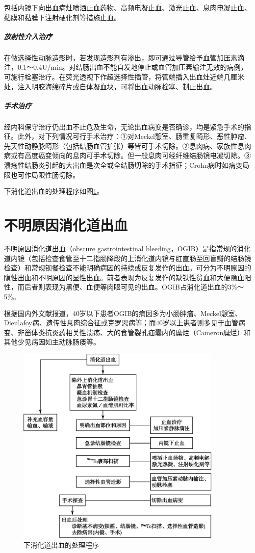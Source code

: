 包括内镜下向出血病灶喷洒止血药物、高频电凝止血、激光止血、息肉电凝止血、黏膜和黏膜下注射硬化剂等措施止血。

\subparagraph{放射性介入治疗}

在做选择性动脉造影时，若发现造影剂有渗出，即可通过导管给予血管加压素滴注，0.1～0.4U/min。对结肠出血不能自发地停止或血管加压素输注无效的病例，可施行栓塞治疗。在荧光透视下作超选择性插管，将管端插入出血灶近端几厘米处，注入明胶海绵碎片或自体凝血块，可将出血动脉栓塞、制止出血。

\subparagraph{手术治疗}

经内科保守治疗仍出血不止危及生命，无论出血病变是否确诊，均是紧急手术的指征。此外，对下列情况可行手术治疗：①对Meckel憩室、肠重复畸形、恶性肿瘤、先天性动静脉畸形（包括结肠血管扩张）等皆可手术切除。②息肉病、家族性息肉病或有高度癌变倾向的息肉可手术切除。但一般息肉可经纤维结肠镜电凝切除。③溃疡性结肠炎引起的大出血是次全或全结肠切除的手术指征；Crohn病时如病变局限也可作局限性肠切除。

下消化道出血的处理程序如图\ref{fig13-2}。

\protect\hypertarget{text00034.html}{}{}

\section{不明原因消化道出血}

不明原因消化道出血（obscure gastrointestinal
bleeding，OGIB）是指常规的消化道内镜（包括检查食管至十二指肠降段的上消化道内镜与肛直肠至回盲瓣的结肠镜检查）和常规钡餐检查不能明确病因的持续或反复发作的出血。可分为不明原因的隐性出血和不明原因的显性出血。前者表现为反复发作的缺铁性贫血和大便隐血阳性，而后者则表现为黑便、血便等肉眼可见的出血。OGIB占消化道出血的3\%～5\%。

根据国内外文献报道，40岁以下患者OGIB的病因多为小肠肿瘤、Meckel憩室、Dieulafoy病、遗传性息肉综合征或克罗恩病等；而40岁以上患者则多见于血管病变、非甾体类抗炎药相关性溃疡、大的食管裂孔疝囊内的糜烂（Cameron糜烂）和其他少见病因如主动脉肠瘘等。

\begin{figure}[!htbp]
 \centering
 \includegraphics[width=3.98958in,height=3.90625in]{./images/Image00059.jpg}
 \captionsetup{justification=centering}
 \caption{下消化道出血的处理程序}
 \label{fig13-2}
  \end{figure} 

